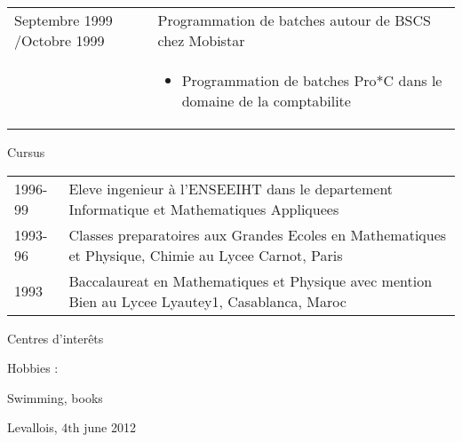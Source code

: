 \documentclass[a4paper,11pt]{letter}
\begin{document}
\begin{tabular}{p{}p{}}
	

Septembre 1999 \slash Octobre 1999 & Programmation de batches autour de BSCS chez Mobistar \\
	
& \begin{itemize}
\item Programmation de batches Pro*C dans le domaine de la comptabilite
\end{itemize} \\

\end{tabular}

Cursus

\begin{tabular}{p{}p{}}
1996-99     & Eleve ingenieur à l'ENSEEIHT dans le departement Informatique et Mathematiques Appliquees \\
1993-96     &  Classes preparatoires aux Grandes Ecoles en Mathematiques et Physique, Chimie au Lycee Carnot, Paris \\
1993     &  Baccalaureat en Mathematiques et Physique avec mention Bien au Lycee Lyautey1, Casablanca, Maroc \\
\end{tabular}

Centres d'interêts

Hobbies :

Swimming, books

Levallois, $4\mathrm{th}$ june 2012
\end{document}
